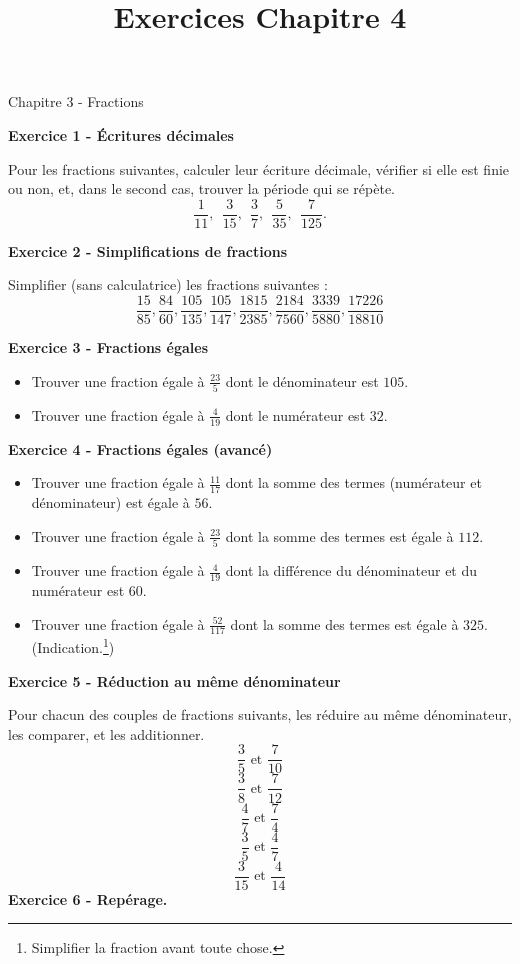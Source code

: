 \documentclass[12 pt]{article}
\title{Exercices Chapitre 4}
\date{}
\theoremstyle{plain}
\newcounter{n}
\numberwithin{n}{section}
\begin{document}
\begin{center}{\Large Chapitre 3 - Fractions}\\ 
 \end{center}


\textbf{Exercice 1 - Écritures décimales}

Pour les fractions suivantes, calculer leur écriture décimale, vérifier si elle est finie ou non, et, dans le second cas, trouver la période qui se répète. 
\[ \frac{1}{11}, \ \ \frac{3}{15}, \ \ \frac{3}{7}, \ \ \frac{5}{35}, \ \ \frac{7}{125}.\]

\textbf{Exercice 2 - Simplifications de fractions}

Simplifier (sans calculatrice) les fractions suivantes :
 $$\frac{15}{85}, \frac{84}{60},
\frac{105}{135}, \frac{105}{147},
\frac{1 815}{2 385}, \frac{2 184}{7 560}, 
\frac{3 339}{5 880}, \frac{17 226}{18 810}$$

\textbf{Exercice 3 - Fractions égales}
\begin{itemize}
\item Trouver une fraction égale à $\frac{23}{5}$ dont le dénominateur est $105$. 
\item Trouver une fraction égale à $\frac{4}{19}$ dont le numérateur est $32$. 
\end{itemize}


\textbf{Exercice 4 - Fractions égales (avancé)}
\begin{itemize}
\item Trouver une fraction égale à $\frac{11}{17}$ dont la somme des termes (numérateur et dénominateur) est égale à $56$. 
\item Trouver une fraction égale à $\frac{23}{5}$ dont la somme des termes est égale à $112$. 
\item Trouver une fraction égale à $\frac{4}{19}$ dont la différence du dénominateur et du numérateur est $60$. 
\item Trouver une fraction égale à $\frac{52}{117}$ dont la somme des termes est égale à $325$. (Indication.\footnote{Simplifier la fraction avant toute chose.})
\end{itemize}

\textbf{Exercice 5 - Réduction au même dénominateur}

Pour chacun des couples de fractions suivants, les réduire au même dénominateur, les comparer, et les additionner. 
\[ \frac{3}{5}\text{ et } \frac{7}{10}\]
\[ \frac{3}{8}\text{ et } \frac{7}{12}\]
\[ \frac{4}{7}\text{ et } \frac{7}{4}\]
\[ \frac{3}{5}\text{ et } \frac{4}{7}\]
\[ \frac{3}{15}\text{ et } \frac{4}{14}\]
\newpage
\textbf{Exercice 6 - Repérage.}
\end{document}
